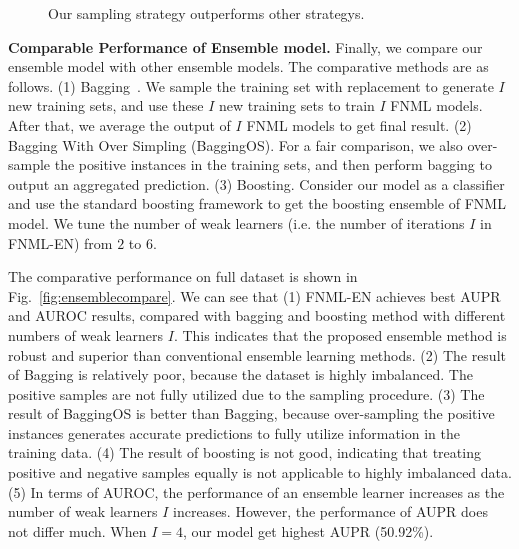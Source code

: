 \documentclass[journal]{IEEEtran}
\begin{document}
\begin{figure}[t]
\centering
{}
\caption{Our sampling strategy outperforms other strategys.}\label{fig:samplingstrategy}
\end{figure}

\textbf{Comparable Performance of Ensemble model.} 
Finally, we compare our ensemble model with other ensemble models. The comparative methods are as follows. (1) Bagging~\cite{Bagging}. We sample the training set with replacement to generate $I$ new training sets, and use these $I$ new training sets to train $I$ FNML models. After that, we average the output of $I$ FNML models to get final result. (2) Bagging With Over Simpling (BaggingOS). For a fair comparison, we also over-sample the positive instances in the training sets, and then perform bagging to output an aggregated prediction. (3) Boosting. Consider our model as a classifier and use the standard boosting framework to get the boosting ensemble of FNML model.  We tune the number of weak learners (i.e. the number of iterations $I$ in FNML-EN) from $2$ to $6$. 

The comparative performance on full dataset is shown in Fig.~\ref{fig:ensemblecompare}. We can see that (1) FNML-EN achieves best AUPR and AUROC results, compared with bagging and boosting method with different numbers of weak learners $I$. This indicates that the proposed ensemble method is robust and superior than conventional ensemble learning methods. (2) The result of Bagging is relatively poor, because the dataset is highly imbalanced. The positive samples are not fully utilized due to the sampling procedure. (3) The result of BaggingOS is better than Bagging, because over-sampling the positive instances generates accurate predictions to fully utilize information in the training data. (4) The result of boosting is not good, indicating that treating positive and negative samples equally is not applicable to highly imbalanced data. (5) In terms of AUROC, the performance of an ensemble learner increases as the number of weak learners $I$ increases. However, the performance of AUPR does not differ much. When $I=4$, our model get highest AUPR (50.92\%).
\end{document}
